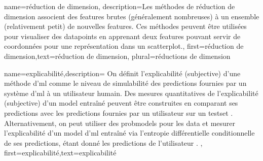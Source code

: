 {name={réduction de dimension},
	description={Les méthodes de réduction de dimension
		associent des \glspl{feature} brutes (généralement nombreuses) à un ensemble (relativement petit) de nouvelles \glspl{feature}.
		Ces méthodes peuvent être utilisées pour visualiser des \glspl{datapoint}
		en apprenant deux \glspl{feature} pouvant servir de coordonnées pour une représentation dans un \gls{scatterplot}.},
	first={réduction de dimension},text={réduction de dimension}, plural={réductions de dimension}
}

{name={explicabilité},description={
		On définit l’explicabilité (subjective) d’une méthode d'\gls{ml}
		comme le niveau de simulabilité \cite{Colin:2022aa} des \glspl{prediction}
		fournies par un système d'\gls{ml} à un utilisateur humain. Des mesures quantitatives de l’explicabilité
		(subjective) d’un \gls{model} entraîné peuvent être construites en comparant ses \glspl{prediction} avec les \glspl{prediction}
		fournies par un utilisateur sur un \gls{testset} \cite{Zhang:2024aa,Colin:2022aa}. Alternativement, on peut utiliser
		des \glspl{probmodel} pour les \gls{data} et mesurer l’explicabilité d’un \gls{model} d'\gls{ml} entraîné
		via l’entropie différentielle conditionnelle de ses \glspl{prediction}, étant donné les \glspl{prediction} de l’utilisateur \cite{JunXML2020,Chen2018}.
	},
	first={explicabilité},text={explicabilité}
}



